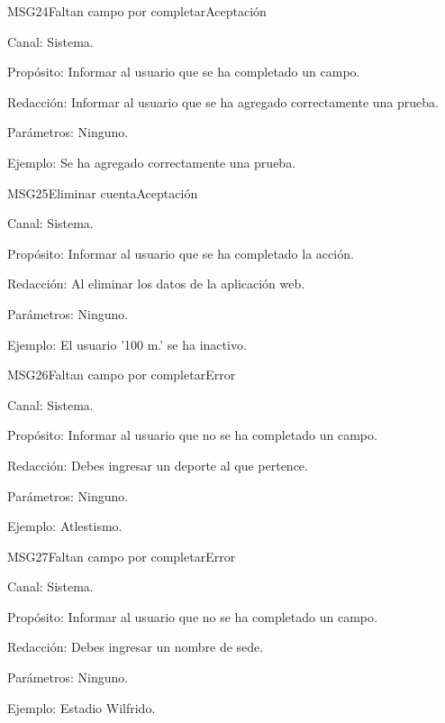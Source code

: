 
\begin{mensaje}{MSG24}{Faltan campo por completar}{Aceptación}
	\item[Canal:] Sistema.
	\item[Propósito:] Informar al usuario que se ha completado un campo.
	\item[Redacción:] Informar al usuario que se ha agregado correctamente una prueba.
	\item[Parámetros:] Ninguno.
	\item[Ejemplo:] Se ha agregado correctamente una prueba.
\end{mensaje}
\newline


\begin{mensaje}{MSG25}{Eliminar cuenta}{Aceptación}
	\item[Canal:] Sistema.
	\item[Propósito:] Informar al usuario que se ha completado la acción.
	\item[Redacción:] Al eliminar los datos de la aplicación web.
	\item[Parámetros:] Ninguno.
	\item[Ejemplo:] El usuario '100 m.' se ha inactivo.
\end{mensaje}
\newline


\begin{mensaje}{MSG26}{Faltan campo por completar}{Error}
	\item[Canal:] Sistema.
	\item[Propósito:] Informar al usuario que no se ha completado un campo.
	\item[Redacción:] Debes ingresar un deporte al que pertence.
	\item[Parámetros:] Ninguno.
	\item[Ejemplo:] Atlestismo.
\end{mensaje}
\newline


\begin{mensaje}{MSG27}{Faltan campo por completar}{Error}
	\item[Canal:] Sistema.
	\item[Propósito:] Informar al usuario que no se ha completado un campo.
	\item[Redacción:] Debes ingresar un nombre de sede.
	\item[Parámetros:] Ninguno.
	\item[Ejemplo:] Estadio Wilfrido.
\end{mensaje}
\newline



